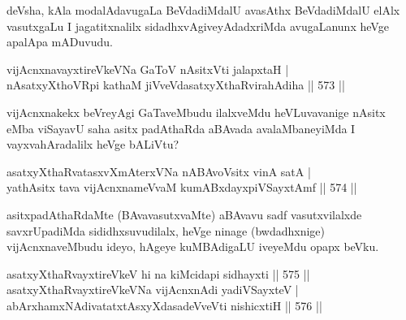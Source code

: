 \begin{artha}
deVsha, kAla modalAdavugaLa BeVdadiMdalU avasAthx BeVdadiMdalU elAlx vasutxgaLu I jagatitxnalilx sidadhxvAgiveyAdadxriMda avugaLanunx heVge apalApa mADuvudu.
\end{artha}

\begin{shl}
vijAcnxnavayxtireVkeVNa GaToV nAsitxVti jalapxtaH | \\
nAsatxyXthoVR\s pi kathaM jiVveVdasatxyXthaRvirahAdiha \hfill||  573 ||  
\end{shl}

\begin{artha}
vijAcnxnakekx beVreyAgi GaTaveMbudu ilalxveMdu heVLuvavanige nAsitx eMba viSayavU saha asitx padAthaRda aBAvada avalaMbaneyiMda I vayxvahAradalilx heVge bALiVtu?
\end{artha}

\begin{shl}
asatxyXthaRvatasxvXmAterxVNa nABAvoV\s sitx vinA satA | \\
yathA\s sitx tava vijAcnxnameVvaM kumABxdayxpiVSayxtAmf \hfill||  574 ||  
\end{shl}

\begin{artha}
asitxpadAthaRdaMte (BAvavasutxvaMte) aBAvavu sadf vasutxvilalxde savxrUpadiMda sididhxsuvudilalx, heVge ninage (bwdadhxnige) vijAcnxnaveMbudu ideyo, hAgeye kuMBAdigaLU iveyeMdu opapx beVku.
\end{artha}

\begin{shl}
asatxyXthaRvayxtireVkeV hi na kiMcidapi sidhayxti \hfill||  575 ||  \\
asatxyXthaRvayxtireVkeVNa vijAcnxnAdi yadiVSayxteV | \\
\footnotemark[1]abArxhamxNAdivatatxtAsxyXdasadeVveVti nishicxtiH \hfill||  576 ||  
\end{shl}


